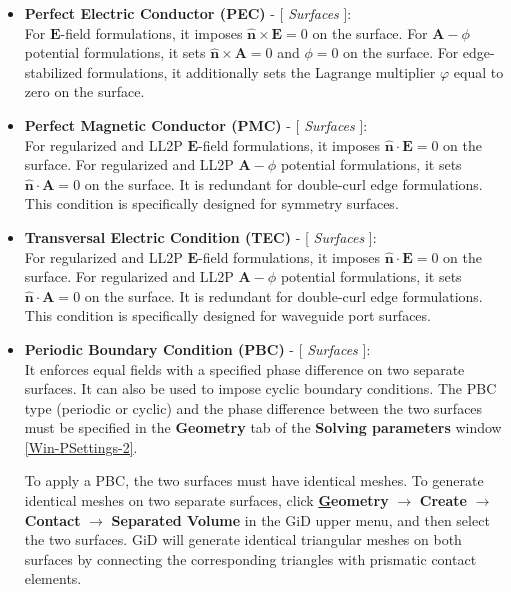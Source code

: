 \begin{itemize}\itemsep0em\label{DirichletBCExp} 
	\item \textbf{Perfect Electric Conductor (PEC)} - [ \textit{Surfaces} ]:\\ 
	For $\mathbf{E}$-field formulations, it imposes $\mathbf{\hat{n}}\times\mathbf{E} = 0$ on the surface. For $\mathbf{A}-\phi$ potential formulations, it sets $\mathbf{\hat{n}}\times\mathbf{A} = 0$ and $\phi = 0$ on the surface. For edge-stabilized formulations, it additionally sets the Lagrange multiplier $\varphi$ equal to zero on the surface.
	\\
	\item \textbf{Perfect Magnetic Conductor (PMC)} - [ \textit{Surfaces} ]:\\ 
	For regularized and LL2P $\mathbf{E}$-field formulations, it imposes $\mathbf{\hat{n}}\cdot\mathbf{E} = 0$ on the surface. For regularized and LL2P $\mathbf{A}-\phi$ potential formulations, it sets $\mathbf{\hat{n}}\cdot\mathbf{A} = 0$ on the surface. It is redundant for double-curl edge formulations. This condition is specifically designed for symmetry surfaces.
	\\
	\item \textbf{Transversal Electric Condition (TEC)} - [ \textit{Surfaces} ]:\\ 
	For regularized and LL2P $\mathbf{E}$-field formulations, it imposes $\mathbf{\hat{n}}\cdot\mathbf{E} = 0$ on the surface. For regularized and LL2P $\mathbf{A}-\phi$ potential formulations, it sets $\mathbf{\hat{n}}\cdot\mathbf{A} = 0$ on the surface. It is redundant for double-curl edge formulations. This condition is specifically designed for waveguide port surfaces. 
	\\
	\item \textbf{Periodic Boundary Condition (PBC)} - [ \textit{Surfaces} ]:\\ 
    It enforces equal fields with a specified phase difference on two separate surfaces. It can also be used to impose cyclic boundary conditions. The PBC type (periodic or cyclic) and the phase difference between the two surfaces must be specified in the \textbf{Geometry} tab of the \textbf{Solving parameters} window \ref{Win-PSettings-2}.
    
    To apply a PBC, the two surfaces must have identical meshes. To generate identical meshes on two separate surfaces, click \textbf{\underline{G}eometry} $\rightarrow$ \textbf{Create} $\rightarrow$ \textbf{Contact} $\rightarrow$ \textbf{Separated Volume} in the GiD upper menu, and then select the two surfaces. GiD will generate identical triangular meshes on both surfaces by connecting the corresponding triangles with prismatic contact elements. 
    

\end{itemize}
